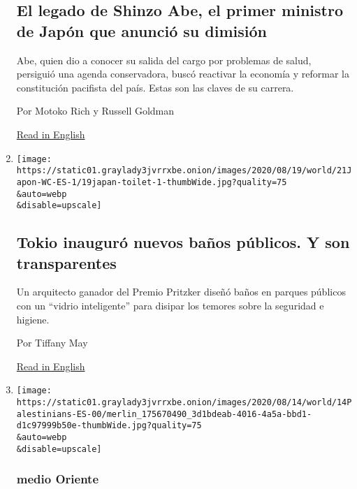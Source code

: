 \begin{enumerate}
{  \subsection{El legado de Shinzo Abe, el primer ministro de Japón que
  anunció su
  dimisión}\label{el-legado-de-shinzo-abe-el-primer-ministro-de-japuxf3n-que-anunciuxf3-su-dimisiuxf3n}}

  Abe, quien dio a conocer su salida del cargo por problemas de salud,
  persiguió una agenda conservadora, buscó reactivar la economía y
  reformar la constitución pacifista del país. Estas son las claves de
  su carrera.

  Por Motoko Rich y Russell Goldman

  \href{https://www.nytimes3xbfgragh.onion/2020/08/28/world/asia/who-is-shinzo-abe.html}{Read
  in English}
\item
  \href{/es/2020/08/21/espanol/mundo/banos-transparentes-japon.html}{}

  \texttt{[image: https://static01.graylady3jvrrxbe.onion/images/2020/08/19/world/21Japon-WC-ES-1/19japan-toilet-1-thumbWide.jpg?quality=75\\\&auto=webp\\\&disable=upscale]}

  \hypertarget{tokio-inauguruxf3-nuevos-bauxf1os-puxfablicos-y-son-transparentes}{%
  \subsection{Tokio inauguró nuevos baños públicos. Y son
  transparentes}\label{tokio-inauguruxf3-nuevos-bauxf1os-puxfablicos-y-son-transparentes}}

  Un arquitecto ganador del Premio Pritzker diseñó baños en parques
  públicos con un ``vidrio inteligente'' para disipar los temores sobre
  la seguridad e higiene.

  Por Tiffany May

  \href{https://www.nytimes3xbfgragh.onion/2020/08/19/world/asia/japan-transparent-toilets.html}{Read
  in English}
\item
  \href{/es/2020/08/14/espanol/mundo/palestinos-israel-acuerdo-paz-uae.html}{}

  \texttt{[image: https://static01.graylady3jvrrxbe.onion/images/2020/08/14/world/14Palestinians-ES-00/merlin\_175670490\_3d1bdeab-4016-4a5a-bbd1-d1c97999b50e-thumbWide.jpg?quality=75\\\&auto=webp\\\&disable=upscale]}

  \hypertarget{medio-oriente-1}{%
  \subsubsection{medio Oriente}\label{medio-oriente-1}}


\end{enumerate}
